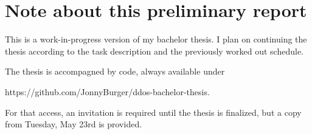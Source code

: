 \chapter{Note about this preliminary report}

This is a work-in-progress version of my bachelor thesis.
I plan on continuing the thesis according to the task description and the previously worked out schedule.

The thesis is accompagned by code, always available under

https://github.com/JonnyBurger/ddos-bachelor-thesis.

For that access, an invitation is required until the thesis is finalized, but a copy from Tuesday, May 23rd is provided.
